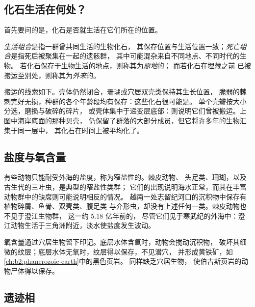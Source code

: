 \subsection*{化石生活在何处？}

首先要问的是，化石是否就生活在它们所在的位置。

\begin{definition}\label{def:b2:palaeoenvironments:assemblages}
\emph{生活组合}是指一群曾共同生活的生物化石，
其保存位置与生活位置一致；\emph{死亡组合}是指死后被聚集在一起的遗骸群，
其中可能混杂来自不同地点、不同时代的生物。
若化石保存于生物生活的地点，则称其为\emph{原地}的；
而若化石在埋藏之前
已被搬运至别处，则称其为\emph{外来}的。
\end{definition}

搬运的线索如下。壳体仍然闭合，珊瑚或穴居双壳类保持其生长位置，
脆弱的棘刺完好无损，种群的各个年龄段均有保存：这些化石很可能是。
单个壳瓣按大小分选，磨损与破碎的碎片，
或壳体集中于递变层底部：则说明它们曾被搬运。上图中海岸底面的那种贝壳，
仍保留了群落的大部分成员，但它将许多年的生物汇集于同一层中，
其化石在时间上被平均化了。

\subsection*{盐度与氧含量}

有些动物只能耐受外海的盐度，称为窄盐性的。棘皮动物、
头足类、珊瑚，以及古生代的三叶虫，是典型的窄盐性类群；
它们的出现说明海水正常，而其在丰富动物群中的缺席则可能说明相反的情况。
越南一处志留纪河口的沉积物中保存有植物碎屑、鱼骨、双壳类、腹足类
与介形虫，却没有上述任何一类。棘皮动物也不见于澄江生物群，
这一约 5.18 亿年前的，
尽管它们见于寒武纪的外海中：澄江动物生活于三角洲附近，淡水使盐度发生波动。

氧含量通过穴居生物留下印记。底层水体含氧时，动物会搅动沉积物，
破坏其细微的纹层；底层水体无氧时，纹层得以保存，不见潜穴，
并形成黄铁矿，如\cref{ch:b2:phanerozoic-earth}中的黑色页岩。
同样缺乏穴居生物，
使伯吉斯页岩的动物尸体得以保存。

\subsection*{遗迹相}


